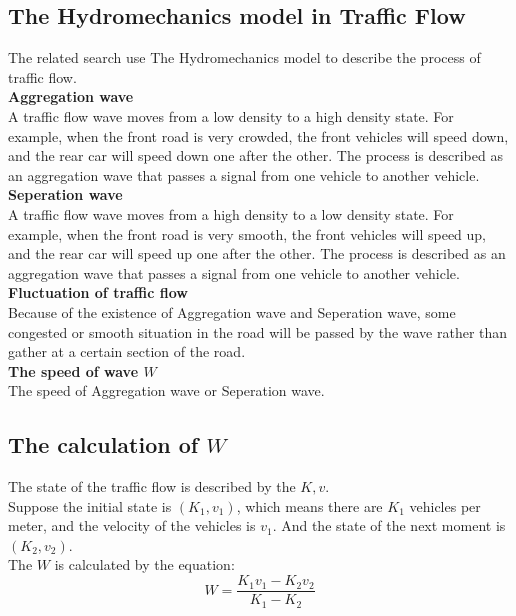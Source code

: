 \documentclass{mcmthesis}
\begin{document}
\subsection{The Hydromechanics model in Traffic Flow}
	The related search use The Hydromechanics model to describe the process of traffic flow.\\
\indent\textbf{Aggregation wave}\\
\indent	A traffic flow wave moves from a low density to a high density state. For example, when the front road is very crowded, the front vehicles will speed down, and the rear car will speed down one after the other. The process is described as an aggregation wave that passes a signal from one vehicle to another vehicle.\\
\indent \textbf{Seperation wave}\\
\indent	A traffic flow wave moves from a high density to a low density state. For example, when the front road is very smooth, the front vehicles will speed up, and the rear car will speed up one after the other. The process is described as an aggregation wave that passes a signal from one vehicle to another vehicle.\\
\indent \textbf{Fluctuation of traffic flow}\\
\indent		Because of the existence of Aggregation wave and Seperation wave, some congested or smooth situation in the road will be passed by the wave rather than gather at a certain section of the road.\\
\indent \textbf{The speed of wave $W$}\\
\indent	The speed of Aggregation wave or Seperation wave.\\
\subsection{The calculation of $W$}
\indent The state of the traffic flow is described by the $K,v$.\\
\indent Suppose the initial state is $(K_{1}, v_{1})$, which means there are $K_{1}$ vehicles per meter, and the velocity of the vehicles is $v_{1}$. And the state of the next moment is $(K_{2}, v_{2})$. \\
\indent The $W$ is calculated by the equation:
\begin{equation}
	W=\frac{K_{1}v_{1}-K_{2}v_{2}}{K_{1}-K_{2}}
\end{equation}
\end{document}

